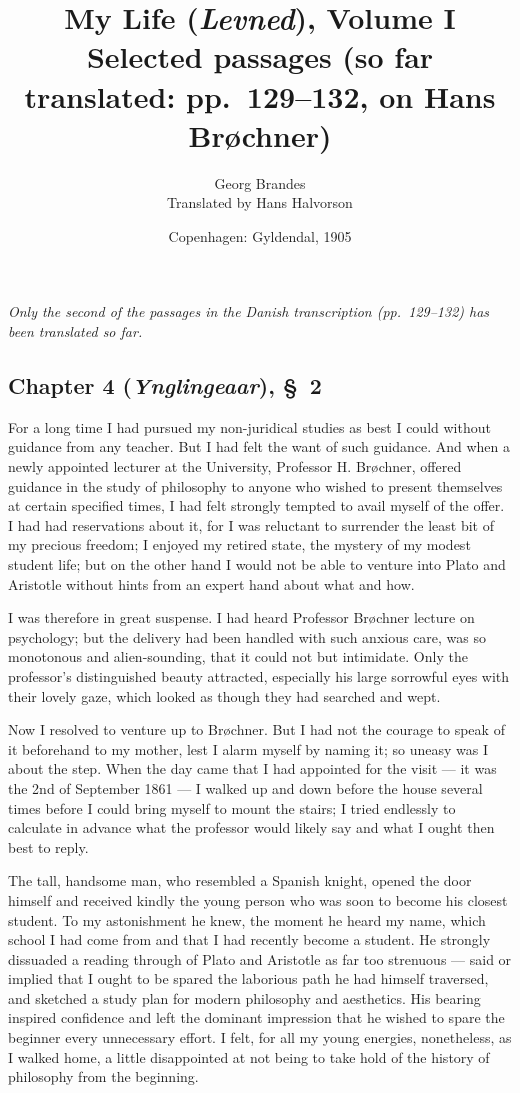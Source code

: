\documentclass[12pt,a4paper]{article}
\title{\textbf{My Life} (\textit{Levned}), Volume I\\[6pt]
  \large Selected passages (so far translated: pp.\ 129--132, on Hans Brøchner)}
\author{Georg Brandes\\[4pt]
  \small Translated by Hans Halvorson}
\date{Copenhagen: Gyldendal, 1905}
\newcommand{\pnum}[1]{\noindent\makebox[0pt][r]{\small\textit{[#1]}\quad}}
\begin{document}
\maketitle
\thispagestyle{fancy}

\bigskip

\noindent\textit{Only the second of the passages in the Danish transcription (pp.\ 129--132) has been translated so far.}

\subsection*{Chapter 4 (\emph{Ynglingeaar}), §~2}

\noindent For a long time I had pursued my non-juridical studies as
best I could without guidance from any teacher. But I had felt the want
of such guidance. And when a newly appointed lecturer at the University,
Professor H. Brøchner, offered guidance in the study of philosophy to
anyone who wished to present themselves at certain specified times, I
had felt strongly tempted to avail myself of the offer. I had had
reservations about it, for I was reluctant to surrender the least bit
of my precious freedom; I enjoyed my retired state, the mystery of my
modest student life; but on the other hand I would not be able to
venture into Plato and Aristotle without hints from an expert hand about
what and how.

I was therefore in great suspense. I had heard Professor Brøchner
lecture on psychology; but the delivery had been handled with such
anxious care, was so monotonous and alien-sounding, that it could not
but intimidate. Only the professor's distinguished beauty attracted,
especially his large sorrowful eyes with their lovely gaze, which
looked as though they had searched and wept.

\pnum{130}Now I resolved to venture up to Brøchner. But I had not
the courage to speak of it beforehand to my mother, lest I alarm myself
by naming it; so uneasy was I about the step. When the day came that I
had appointed for the visit --- it was the 2nd of September 1861 --- I
walked up and down before the house several times before I could bring
myself to mount the stairs; I tried endlessly to calculate in advance
what the professor would likely say and what I ought then best to reply.

The tall, handsome man, who resembled a Spanish knight, opened the
door himself and received kindly the young person who was soon to become
his closest student. To my astonishment he knew, the moment he heard my
name, which school I had come from and that I had recently become a
student. He strongly dissuaded a reading through of Plato and Aristotle
as far too strenuous --- said or implied that I ought to be spared the
laborious path he had himself traversed, and sketched a study plan for
modern philosophy and aesthetics. His bearing inspired confidence and
left the dominant impression that he wished to spare the beginner every
unnecessary effort. I felt, for all my young energies, nonetheless, as
I walked home, a little disappointed at not being to take hold of the
history of philosophy from the beginning.
\end{document}

